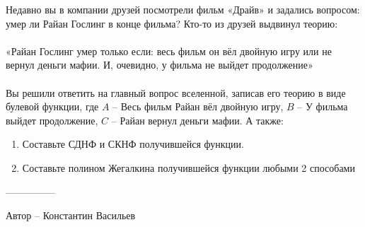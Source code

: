 \question
Недавно вы в компании друзей посмотрели фильм «Драйв» и задались вопросом: умер ли Райан Гослинг в конце фильма? Кто-то из друзей выдвинул теорию:
\\
\\
«Райан Гослинг умер только если: весь фильм он вёл двойную игру или не вернул деньги мафии. И, очевидно, у фильма не выйдет продолжение»
\\
\\
Вы решили ответить на главный вопрос вселенной, записав его теорию в виде булевой функции, где $A$ – Весь фильм Райан вёл двойную игру, $B$ – У фильма выйдет продолжение, $C$ – Райан вернул деньги мафии. А также:
\begin{enumerate}
    \item Составьте СДНФ и СКНФ получившейся функции.
    \item Составьте полином Жегалкина получившейся функции любыми 2 способами
\end{enumerate}

---------------

Автор -- Константин Васильев